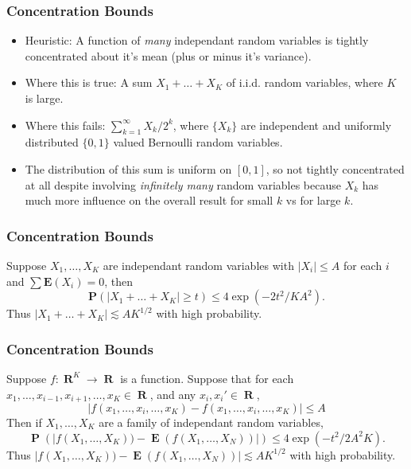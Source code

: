 \documentclass[usenames,dvipsnames,handout]{beamer}
\DeclareMathOperator{\RR}{\textbf{R}}
\DeclareMathOperator{\PP}{\mathbf{P}}
\DeclareMathOperator{\EE}{\mathbf{E}}
\begin{document}
\begin{frame}
    \frametitle{Concentration Bounds}

    \begin{itemize}
        \item Heuristic: A function of \emph{many} independant random variables is tightly concentrated about it's mean (plus or minus it's variance).

        \item Where this is true: A sum $X_1 + \dots + X_K$ of i.i.d. random variables, where $K$ is large.

        \item Where this fails: $\sum_{k = 1}^\infty X_k / 2^k$, where $\{ X_k \}$ are independent and uniformly distributed $\{ 0, 1 \}$ valued Bernoulli random variables.

        \item The distribution of this sum is uniform on $[0,1]$, so not tightly concentrated at all despite involving \emph{infinitely many} random variables because $X_k$ has much more influence on the overall result for small $k$ vs for large $k$.
    \end{itemize}
\end{frame}







\begin{frame}
    \frametitle{Concentration Bounds}

    \begin{theorem}
        Suppose $X_1,\dots,X_K$ are independant random variables with $|X_i| \leq A$ for each $i$ and $\sum \mathbf{E}(X_i) = 0$, then
        \[ \mathbf{P} \left( |X_1 + \dots + X_K| \geq t \right) \leq 4 \exp \left( - 2t^2 / KA^2 \right). \]
        Thus $|X_1 + \dots + X_K| \lesssim A K^{1/2}$ with high probability.
    \end{theorem}
\end{frame}






\begin{frame}
    \frametitle{Concentration Bounds}

    \begin{theorem}
        Suppose $f: \RR^K \to \RR$ is a function. Suppose that for each $x_1,\dots,x_{i-1},x_{i+1},\dots,x_K \in \RR$, and any $x_i,x_i' \in \RR$,
        \[ |f(x_1,\dots,x_i,\dots,x_K) - f(x_1,\dots,x_i,\dots,x_K)| \leq A \]
        Then if $X_1,\dots,X_K$ are a family of independant random variables,
        \[ \PP(|f(X_1,\dots,X_K)) - \EE(f(X_1,\dots,X_N))|) \leq 4 \exp \left( - t^2/2 A^2K \right). \]
        Thus $|f(X_1,\dots,X_K)) - \EE(f(X_1,\dots,X_N))| \lesssim AK^{1/2}$ with high probability.
    \end{theorem}
\end{frame}
\end{document}
